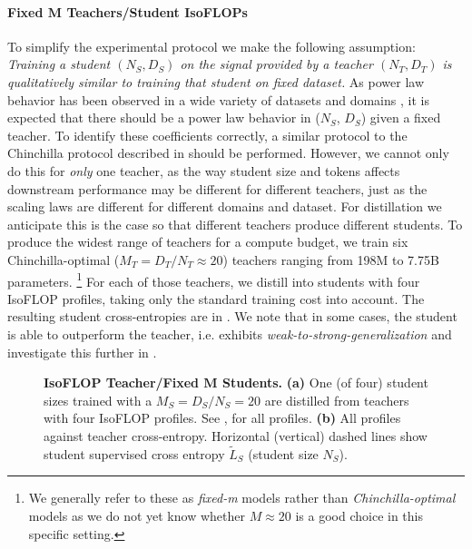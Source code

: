 \paragraph{Fixed $\bm M$ Teachers/Student IsoFLOPs}
To simplify the experimental protocol we make the following assumption:
\emph{Training a student $(N_S,D_S)$ on the signal provided by a teacher $(N_T,D_T)$ is qualitatively similar to training that student on fixed dataset.}
As power law behavior has been observed in a wide variety of datasets and domains \citep{DBLP:journals/corr/abs-2010-14701}, it is expected that there should be a power law behavior in ($N_S$, $D_S$) given a fixed teacher.
To identify these coefficients correctly,
a similar protocol to the Chinchilla protocol described in  should be performed.
However, we cannot only do this for \emph{only} one teacher, as the way student size and tokens affects downstream performance may be different for different teachers,
just as the scaling laws are different for different domains and dataset.
For distillation we anticipate this is the case so that different teachers produce different students.
To produce the widest range of teachers for a compute budget, we train six Chinchilla-optimal ($M_T=D_T/N_T\approx 20$) teachers ranging from 198M to 7.75B parameters.
\footnote{We generally refer to these as \emph{fixed-m} models rather than \emph{Chinchilla-optimal} models as we do not yet know whether $M\approx 20$ is a good choice in this specific setting.}
For each of those teachers, we distill into students with four IsoFLOP profiles, taking only the standard training cost into account.
The resulting student cross-entropies are in .
We note that in some cases, the student is able to outperform the teacher, i.e. exhibits \emph{weak-to-strong-generalization} \citep{DBLP:conf/icml/BurnsIKBGACEJLS24,DBLP:journals/corr/abs-2410-18837}
and investigate this further in .


\begin{figure}[h]
    \vspace{-0.1cm}
    \hfill
        \caption{\textbf{IsoFLOP Teacher/Fixed $\bm M$ Students.} \textbf{(a)} One (of four) student sizes
    trained with a $M_S=D_S/N_S=20$ are distilled from teachers with four IsoFLOP profiles.
        See ,  for all profiles. \textbf{(b)} All profiles against teacher cross-entropy.
        Horizontal (vertical) dashed lines show student supervised cross entropy $\widetilde{L}_S$ (student size $N_S$).
	}\vspace{-0.15cm}
\label{fig:isoflop-teacher-fixedm-students}
\end{figure}



